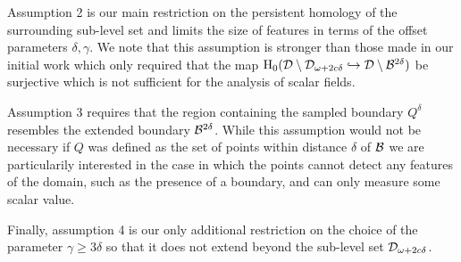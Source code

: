 Assumption 2 is our main restriction on the persistent homology of the surrounding sub-level set and limits the size of features in terms of the offset parameters $\delta,\gamma$.
We note that this assumption is stronger than those made in our initial work which only required that the map $\mathrm{H}_0({\mathcal{D}}\setminus{\mathcal{D}}_{\omega+2c\delta}\hookrightarrow{\mathcal{D}}\setminus{\mathcal{B}}^{2\delta})$ be surjective which is not sufficient for the analysis of scalar fields.

Assumption 3 requires that the region containing the sampled boundary $Q^\delta$ resembles the extended boundary ${\mathcal{B}}^{2\delta}$.
While this assumption would not be necessary if $Q$ was defined as the set of points within distance $\delta$ of ${\mathcal{B}}$ we are particularily interested in the case in which the points cannot detect any features of the domain, such as the presence of a boundary, and can only measure some scalar value.

Finally, assumption 4 is our only additional restriction on the choice of the parameter $\gamma\geq 3\delta$ so that it does not extend beyond the sub-level set ${\mathcal{D}}_{\omega+2c\delta}$.


%
%


